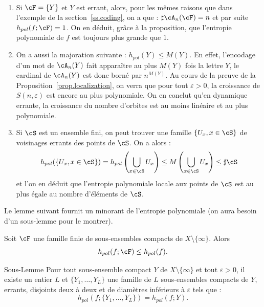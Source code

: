 \begin{remasc*}\ 
\begin{enumerate}
\item Si $\cF=\{Y\}$ et $Y$ est errant, alors, pour les mêmes raisons que dans l'exemple de la section~\ref{ss.coding}, on a que : $\sharp \cA_n(\cF)= n$ et par suite $h_{pol}(f; \cF)=1$. On en déduit, grâce à la proposition, que l'entropie polynomiale de $f$ est toujours plus grande que $1$.
\item On a aussi la majoration suivante : $h_{pol}(Y)\leq M(Y)$. En effet, l'encodage d'un mot de $\cA_n(Y)$ fait apparaître au plus $M(Y)$ fois la lettre \og$Y$\fg, le cardinal de $\cA_n(Y)$ est donc borné par $n^{M(Y)}$. Au cours de la preuve de la Proposition~\ref{prop.localization}, on verra que pour tout $\varepsilon>0$, la croissance de $S(n,\varepsilon)$ est encore au plus polynomiale. On en conclut qu'en dynamique errante, la croissance du nombre d'orbites est au moins linéaire et au plus polynomiale.
\item Si $\cS$ est un ensemble fini, on peut trouver une famille $\{U_x, x \in \cS\}$ de voisinages errants des points de $\cS$. On a alors :
\[
h_{pol}(\{U_x, x \in \cS\})=h_{pol}\left(\bigcup_{x \in \cS} U_x\right) \leq M\left(\bigcup_{x \in \cS} U_x\right) \leq \sharp \cS
\]
et l'on en déduit que l'entropie polynomiale locale {aux points} de $\cS$ est {au plus égale} au nombre d'éléments de $\cS$.
\end{enumerate}
\end{remasc*}


Le lemme suivant fournit un minorant de l'entropie polynomiale (on aura besoin d'un sous-lemme pour le montrer).

\begin{lemm}\label{lem.inequality}
Soit $\cF$ une famille finie de sous-ensembles compacts de $X \setminus\{\infty\}$. Alors
\[
h_{pol}(f;\cF) \leq h_{pol}(f).
\]
\end{lemm}

\begin{enonce}{Sous-Lemme}\label{sublemma.cut1}
Pour tout sous-ensemble compact $Y$ de $X \setminus \{\infty\}$ et tout $\varepsilon>0$, il existe un entier $L$ et $\{Y_1, \dots,Y_L\}$ une famille de $L$ sous-ensembles compacts de $Y$, {errants}, disjoints deux à deux et de diamètres inférieurs à $\varepsilon$ tels que :
\[
h_{pol}(f;\{ Y_1, \dots,Y_L \}) = h_{pol}(f;Y).
\]
\end{enonce}

